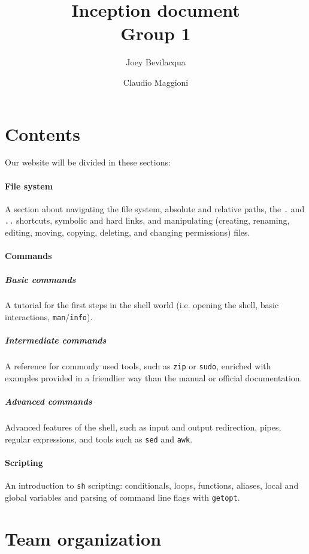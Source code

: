 \documentclass[hidelinks,12pt,a4paper,numbers=enddot]{scrartcl}
\title{Inception document \\
	{\large Group 1}}
\author{Joey Bevilacqua \and Claudio Maggioni}
\begin{document}
\maketitle
\tableofcontents
\newpage

\section{Contents}\label{contents}

Our website will be divided in these sections:

\paragraph{File system}
A section about navigating the file system, absolute and relative paths,
the \texttt{.} and \texttt{..} shortcuts, symbolic and hard links, and
manipulating (creating, renaming, editing, moving, copying, deleting,
and changing permissions) files.

\paragraph{Commands}

\subparagraph{Basic commands}
A tutorial for the first steps in the shell world (i.e. opening the shell,
basic interactions, \texttt{man}/\texttt{info}).

\subparagraph{Intermediate commands}
A reference for commonly used tools, such as \texttt{zip} or \texttt{sudo},
enriched with examples provided in a friendlier way than the manual or official
documentation.

\subparagraph{Advanced commands}
Advanced features of the shell, such as input and output redirection, pipes,
regular expressions, and tools such as \texttt{sed} and \texttt{awk}.

\paragraph{Scripting}
An introduction to \texttt{sh} scripting: conditionals, loops, functions, aliases,
local and global variables and parsing of command line flags with \texttt{getopt}.

\newpage

\section{Team organization}\label{team-organization}
\end{document}
